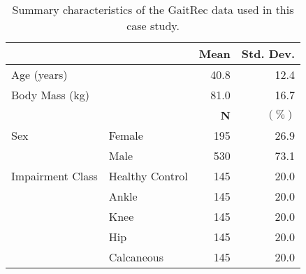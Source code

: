 \begin{table}
\centering
\begin{tabular}[t]{llrr}
\toprule
  &    & \textbf{Mean} & \textbf{Std. Dev.}\\
\midrule
Age (years) &  & 40.8 & 12.4\\
Body Mass (kg) &  & 81.0 & 16.7\\
\midrule
 &  & \textbf{N} & $\mathbf{\mathbf{(\%)}}$\\
\midrule
Sex & Female & 195 & 26.9\\
 & Male & 530 & 73.1\\
Impairment Class & Healthy Control & 145 & 20.0\\
 & Ankle & 145 & 20.0\\
 & Knee & 145 & 20.0\\
 & Hip & 145 & 20.0\\
 & Calcaneous & 145 & 20.0\\
\bottomrule
\end{tabular}
\caption{Summary characteristics of the GaitRec data used in this case study.}
\label{tab:tab1.}
\end{table}
